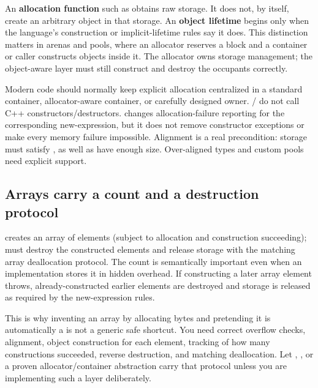 An \textbf{allocation function} such as  obtains raw storage. It does not, by itself, create an arbitrary  object in that storage. An \textbf{object lifetime} begins only when the language's construction or implicit-lifetime rules say it does. This distinction matters in arenas and pools, where an allocator reserves a block and a container or caller constructs objects inside it. The allocator owns storage management; the object-aware layer must still construct and destroy the occupants correctly.

Modern code should normally keep explicit allocation centralized in a standard container, allocator-aware container, or carefully designed owner. / do not call C++ constructors/destructors.  changes allocation-failure reporting for the corresponding new-expression, but it does not remove constructor exceptions or make every memory failure impossible. Alignment is a real precondition: storage must satisfy , as well as have enough size. Over-aligned types and custom pools need explicit support.

\subsection{Arrays carry a count and a destruction protocol}\label{01-foundations-i-ch004-arrays-carry-a-count-and-a-destruction-protocol}

\hypertarget{01-foundations-i-ch004-arrays-carry-a-count-and-a-destruction-protocol}{}

 creates an array of  elements (subject to allocation and construction succeeding);  must destroy the constructed elements and release storage with the matching array deallocation protocol. The count is semantically important even when an implementation stores it in hidden overhead. If constructing a later array element throws, already-constructed earlier elements are destroyed and storage is released as required by the new-expression rules.

This is why inventing an array by allocating  bytes and pretending it is automatically a  is not a generic safe shortcut. You need correct overflow checks, alignment, object construction for each element, tracking of how many constructions succeeded, reverse destruction, and matching deallocation. Let , , or a proven allocator/container abstraction carry that protocol unless you are implementing such a layer deliberately.


